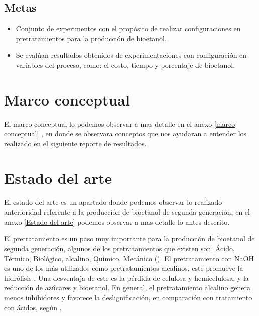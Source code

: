 \documentclass[12pt]{article}
\begin{document}
	\subsection{Metas}
	
	\begin{itemize}

		
		\item 
		Conjunto de experimentos con el propósito de realizar configuraciones en pretratamientos para la producción de bioetanol. 
		
		
		\item 
		Se evalúan resultados obtenidos de experimentaciones con configuración en variables del proceso, como: el costo, tiempo y porcentaje de bioetanol.
		
	
		
	\end{itemize}
	\newpage
	
	\section{Marco conceptual}
	
	El marco conceptual lo podemos observar a mas detalle en el anexo 	\ref{marco conceptual} , en donde se observara conceptos que nos ayudaran a entender los realizado en el siguiente reporte de resultados.
	
	

	\section{Estado del arte}

	El estado del arte es un apartado donde podemos observar lo realizado anterioridad referente a la producción de bioetanol de segunda generación, en el anexo \ref{Estado del arte} podemos observar a mas detalle lo antes descrito.
	
	El pretratamiento es un paso muy importante para la producción de bioetanol de segunda generación, algunos de los pretratamientos que existen son: Ácido, Térmico, Biológico, alcalino, Químico, Mecánico (\cite{ADITIYA2016631}).
	El pretratamiento con NaOH es uno de los más utilizados como pretratamientos alcalinos, este promueve la hidrólisis \cite{espinosa2021pretratamiento}. Una desventaja de este es la pérdida de celulosa y hemicelulosa, y la reducción de azúcares y bioetanol.
	En general, el pretratamiento alcalino genera menos inhibidores y favorece la deslignificación, en comparación con tratamiento con ácidos, según \cite{valles2022estudio}. 
	
\end{document}
